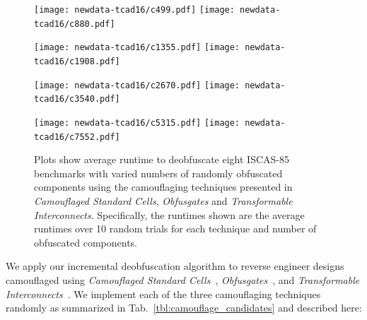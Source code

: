 \documentclass[proposal]{umassthesis}  %
\begin{document}
\begin{figure}[!hbt]
  \centering
    \texttt{[image: newdata-tcad16/c499.pdf]} \hspace{.3cm}
    \texttt{[image: newdata-tcad16/c880.pdf]} 
    \vspace{-2mm}

    \texttt{[image: newdata-tcad16/c1355.pdf]} \hspace{.3cm}
    \texttt{[image: newdata-tcad16/c1908.pdf]} 
        \vspace{-2mm}

    \texttt{[image: newdata-tcad16/c2670.pdf]} \hspace{.3cm}
    \texttt{[image: newdata-tcad16/c3540.pdf]}
        \vspace{-2mm}

    \texttt{[image: newdata-tcad16/c5315.pdf]} \hspace{.3cm}
    \texttt{[image: newdata-tcad16/c7552.pdf]}

    \caption{Plots show average runtime to deobfuscate eight ISCAS-85 benchmarks with varied numbers of randomly obfuscated components using the camouflaging techniques presented in {\textit{Camouflaged Standard Cells}\cite{rajendran-13}, \textit{Obfusgates}\cite{malik-obfusgate} and \textit{Transformable Interconnects}\cite{chen-2015-dummyWire}}. Specifically, the runtimes shown are the average runtimes over 10 random trials for each technique and number of obfuscated components.}
    \label{fig:tcad16-comparison}
\end{figure}
We apply our incremental deobfuscation algorithm to reverse engineer designs camouflaged using \textit{Camouflaged Standard Cells}~\cite{rajendran-13}, \textit{Obfusgates}~\cite{malik-obfusgate}, and \textit{Transformable Interconnects}~\cite{chen-2015-dummyWire}. We implement each of the three camouflaging techniques randomly as summarized in Tab.~\ref{tbl:camouflage_candidates} and described here: 
\end{document}
